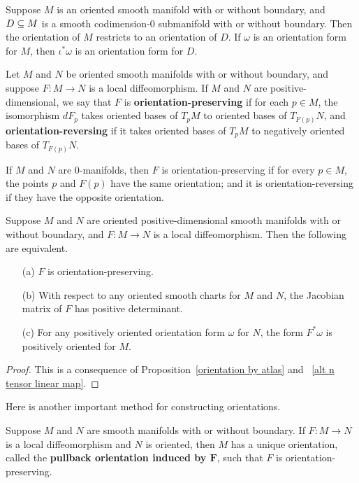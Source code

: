 \begin{proposition}
Suppose $M$ is an oriented smooth manifold with or without boundary, and $D\subseteq M$ is a smooth codimension-$0$ submanifold with or without boundary. Then the orientation of $M$ restricts to an orientation of $D$. If $\omega$ is an orientation form for $M$, then $\iota^*\omega$ is an orientation form for $D$.
\end{proposition}
Let $M$ and $N$ be oriented smooth manifolds with or without boundary, and suppose $F:M\to N$ is a local diffeomorphism. If $M$ and $N$ are positive-dimensional, we say that $F$ is \textbf{orientation-preserving} if for each $p\in M$, the isomorphism $dF_p$ takes oriented bases of $T_pM$ to oriented bases of $T_{F(p)}N$, and \textbf{orientation-reversing} if it takes oriented bases of $T_pM$ to negatively oriented bases of $T_{F(p)}N$.\par
If $M$ and $N$ are $0$-manifolds, then $F$ is orientation-preserving if for every $p\in M$, the points $p$ and $F(p)$ have the same orientation; and it is orientation-reversing if they have the opposite orientation.
\begin{proposition}
Suppose $M$ and $N$ are oriented positive-dimensional smooth manifolds with or without boundary, and $F:M\to N$ is a local diffeomorphism. Then the following are equivalent.
\begin{itemize}
\item[(a)] $F$ is orientation-preserving.
\item[(b)] With respect to any oriented smooth charts for $M$ and $N$, the Jacobian matrix of $F$ has positive determinant.
\item[(c)] For any positively oriented orientation form $\omega$ for $N$, the form $F^*\omega$ is positively oriented for $M$.
\end{itemize} 
\end{proposition}
\begin{proof}
This is a consequence of Proposition~\ref{orientation by atlas} and ~\ref{alt n tensor linear map}.
\end{proof}
Here is another important method for constructing orientations.
\begin{proposition}\label{orientation pull back}
Suppose $M$ and $N$ are smooth manifolds with or without boundary. If $F:M\to N$ is a local diffeomorphism and $N$ is oriented, then $M$ has a unique orientation, called the \textbf{pullback orientation induced by $\bm{F}$}, such that $F$ is orientation-preserving.
\end{proposition}
